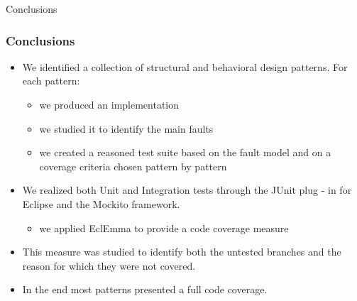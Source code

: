 \documentclass{beamer}
\theoremstyle{definition}
\begin{document}
		
		\begin{section}{}
			\begin{subsection}{Conclusions}
				\begin{frame}
					
					\frametitle{Conclusions}
						\begin{itemize}
						\item We identified a collection of structural and behavioral design patterns. For each pattern:
							{\footnotesize \begin{itemize}
								\item we produced an implementation
							\end{itemize} 
							\begin{itemize}
								\item we studied it to identify the main faults
							\end{itemize} 
								\begin{itemize}
									\item we created a reasoned test suite based on the fault model and on a coverage criteria chosen pattern by pattern
								\end{itemize} }
						
						\item We realized both Unit and Integration tests through the JUnit plug - in for Eclipse and the Mockito framework.
								{\footnotesize \begin{itemize}
									\item we applied EclEmma to provide a code coverage measure
								\end{itemize}} 
								
						\item This measure was studied to identify both the untested branches and the reason for which they were not covered.
						
						\item In the end most patterns presented a full code coverage.
					\end{itemize}
					
				\end{frame}
			\end{subsection}
		\end{section}
\end{document}

